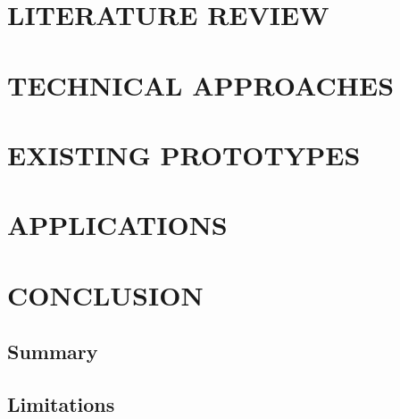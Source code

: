 \documentclass[12pt,a4paper]{report}
\begin{document}
\chapter{LITERATURE REVIEW}
\label{chap:literature}



\chapter{TECHNICAL APPROACHES}
\label{chap:technical}



\chapter{EXISTING PROTOTYPES}
\label{chap:prototypes}



\chapter{APPLICATIONS}
\label{chap:applications}



\chapter{CONCLUSION}
\label{chap:conclusion}

\section{Summary}

\section{Limitations}
\end{document}
